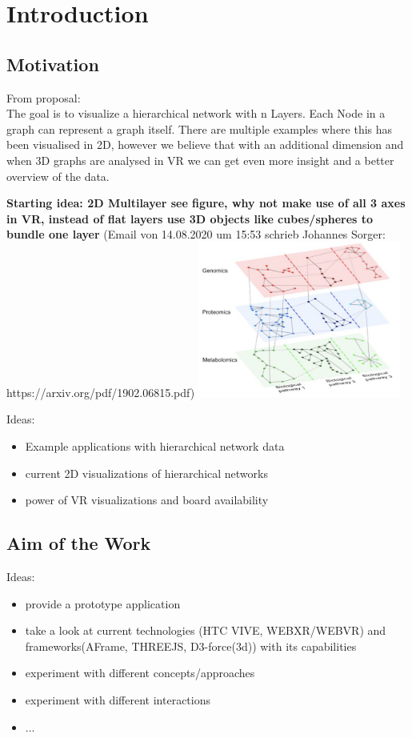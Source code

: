 \chapter{Introduction}

\section{Motivation}
From proposal: \\
The	 goal	 is	 to	 visualize	 a	 hierarchical	 network	 with	 n	 Layers.	 Each	 Node	 in	 a	 graph	 can	
represent	a	graph	itself.	There	are	multiple	examples	where	this	has	been	visualised	in	2D,	
however	we	believe	that	with	an	additional	dimension	and	when	3D	graphs	are	analysed	in	
VR	we	can	get	even	more	insight	and	a	better	overview	of	the	data.	

\textbf{Starting idea: 2D Multilayer see figure, why not make use of all 3 axes in VR, instead of flat layers use 3D objects like cubes/spheres to bundle one layer} (Email von 14.08.2020 um 15:53 schrieb Johannes Sorger: https://arxiv.org/pdf/1902.06815.pdf)
\includegraphics[width=0.5\textwidth]{chapters/graphics/2dmultilayerVis.jpg}

Ideas:
\begin{itemize}
    \item Example applications with hierarchical network data
    \item current 2D visualizations of hierarchical networks
    \item power of VR visualizations and board availability
\end{itemize}

\section{Aim of the Work}

Ideas:
\begin{itemize}
    \item provide a prototype application
    \item take a look at current technologies (HTC VIVE, WEBXR/WEBVR) and frameworks(AFrame, THREEJS, D3-force(3d)) with its capabilities 
    \item experiment with different concepts/approaches
    \item experiment with different interactions
    \item ...
\end{itemize}

